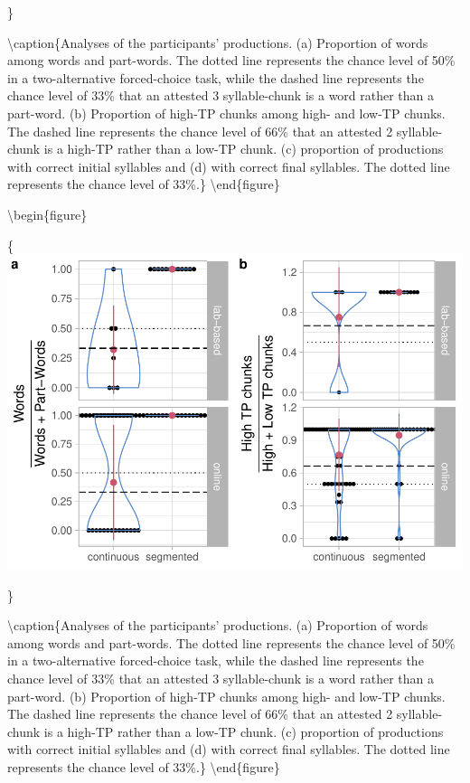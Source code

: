 \documentclass[
]{article}
\begin{document}
\}

\textbackslash caption\{Analyses of the participants' productions. (a)
Proportion of words among words and part-words. The dotted line
represents the chance level of 50\% in a two-alternative forced-choice
task, while the dashed line represents the chance level of 33\% that an
attested 3 syllable-chunk is a word rather than a part-word. (b)
Proportion of high-TP chunks among high- and low-TP chunks. The dashed
line represents the chance level of 66\% that an attested 2
syllable-chunk is a high-TP rather than a low-TP chunk. (c) proportion
of productions with correct initial syllables and (d) with correct final
syllables. The dotted line represents the chance level of
33\%.\}\label{fig:recall-w-pw-chunks-positions-plot}
\textbackslash end\{figure\}

\textbackslash begin\{figure\}

\{\centering \includegraphics[width=0.8\linewidth]{segmentation_recall_combined_for_revision_files/figure-latex/recall-w-pw-chunks-positions-plot-wpw-chunks-1}

\}

\textbackslash caption\{Analyses of the participants' productions. (a)
Proportion of words among words and part-words. The dotted line
represents the chance level of 50\% in a two-alternative forced-choice
task, while the dashed line represents the chance level of 33\% that an
attested 3 syllable-chunk is a word rather than a part-word. (b)
Proportion of high-TP chunks among high- and low-TP chunks. The dashed
line represents the chance level of 66\% that an attested 2
syllable-chunk is a high-TP rather than a low-TP chunk. (c) proportion
of productions with correct initial syllables and (d) with correct final
syllables. The dotted line represents the chance level of
33\%.\}\label{fig:recall-w-pw-chunks-positions-plot-wpw-chunks}
\textbackslash end\{figure\}
\end{document}

